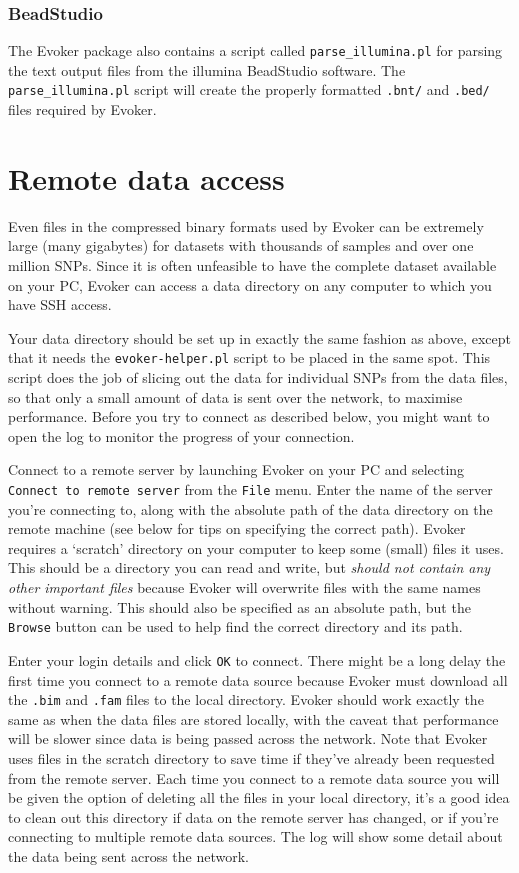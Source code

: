 \documentclass{article}
\begin{document}
\subsubsection{BeadStudio}
The Evoker package also contains a script called \texttt{parse\_illumina.pl} for parsing the text output files from the illumina BeadStudio software. The \texttt{parse\_illumina.pl} script will create the properly formatted \texttt{.bnt/} and \texttt{.bed/} files required by Evoker. 

\section{Remote data access}

Even files in the compressed binary formats used by Evoker can be extremely large (many gigabytes) for datasets with thousands of samples and over one million SNPs. Since it is often unfeasible to have the complete dataset available on your PC, Evoker can access a data directory on any computer to which you have SSH access.

Your data directory should be set up in exactly the same fashion as above, except that it needs the \texttt{evoker-helper.pl} script to be placed in the same spot. This script does the job of slicing out the data for individual SNPs from the data files, so that only a small amount of data is sent over the network, to maximise performance. Before you try to connect as described below, you might want to open the log to monitor the progress of your connection.

Connect to a remote server by launching Evoker on your PC and selecting \texttt{Connect to remote server} from the \texttt{File} menu. Enter the name of the server you're connecting to, along with the absolute path of the data directory on the remote machine (see below for tips on specifying the correct path). Evoker requires a `scratch' directory on your computer to keep some (small) files it uses. This should be a directory you can read and write, but \emph{should not contain any other important files} because Evoker will overwrite files with the same names without warning. This should also be specified as an absolute path, but the \texttt{Browse} button can be used to help find the correct directory and its path.

Enter your login details and click \texttt{OK} to connect. There might be a long delay the first time you connect to a remote data source because Evoker must download all the \texttt{.bim} and \texttt{.fam} files to the local directory. Evoker should work exactly the same as when the data files are stored locally, with the caveat that performance will be slower since data is being passed across the network. Note that Evoker uses files in the scratch directory to save time if they've already been requested from the remote server. Each time you connect to a remote data source you will be given the option of deleting all the files in your local directory, it's a good idea to clean out this directory if data on the remote server has changed, or if you're connecting to multiple remote data sources. The log will show some detail about the data being sent across the network.
\end{document}
